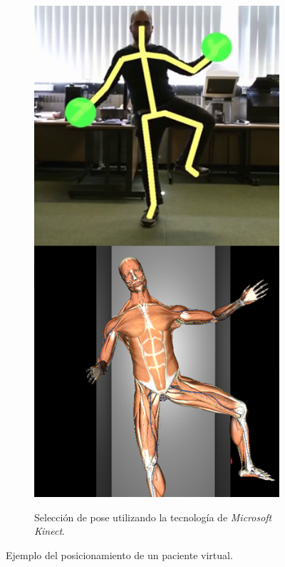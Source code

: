 \begin{figure}[ht]
\begin{subfigure}[b]{0.32\linewidth}
    \end{subfigure}
    \null\hfill
     \begin{subfigure}[b]{0.32\linewidth}
        \centering
        {\includegraphics[width=\linewidth]{IMG/Pose2.png}}
        \caption{Selección de pose utilizando la tecnología de \emph{Microsoft Kinect}. \label{subfig:kinect}}
    \end{subfigure}
    \caption{\label{fig:selecpose} Ejemplo del posicionamiento de un paciente virtual.}
   \end{figure}

